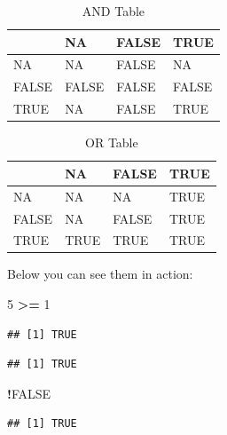 \documentclass[]{book}
\newenvironment{Shaded}{\begin{snugshade}}{\end{snugshade}}
\newcommand{\DecValTok}[1]{\textcolor[rgb]{0.00,0.00,0.81}{#1}}
\newcommand{\StringTok}[1]{\textcolor[rgb]{0.31,0.60,0.02}{#1}}
\newcommand{\OtherTok}[1]{\textcolor[rgb]{0.56,0.35,0.01}{#1}}
\newcommand{\OperatorTok}[1]{\textcolor[rgb]{0.81,0.36,0.00}{\textbf{#1}}}
\theoremstyle{definition}
\theoremstyle{definition}
\theoremstyle{definition}
\theoremstyle{remark}
\begin{document}
\begin{longtable}[t]{llll}
\caption{\label{tab:tab-logics}AND Table}\\
\toprule
  & NA & FALSE & TRUE\\
\midrule
NA & NA & FALSE & NA\\
FALSE & FALSE & FALSE & FALSE\\
TRUE & NA & FALSE & TRUE\\
\bottomrule
\end{longtable}

\begin{longtable}[t]{llll}
\caption{\label{tab:tab-logics}OR Table}\\
\toprule
  & NA & FALSE & TRUE\\
\midrule
NA & NA & NA & TRUE\\
FALSE & NA & FALSE & TRUE\\
TRUE & TRUE & TRUE & TRUE\\
\bottomrule
\end{longtable}

Below you can see them in action:

\begin{Shaded}
\begin{Highlighting}[]
\DecValTok{5} \OperatorTok{>=}\StringTok{ }\DecValTok{1}
\end{Highlighting}
\end{Shaded}

\begin{verbatim}
## [1] TRUE
\end{verbatim}

\begin{Shaded}
\end{Shaded}

\begin{verbatim}
## [1] TRUE
\end{verbatim}

\begin{Shaded}
\begin{Highlighting}[]
\OperatorTok{!}\OtherTok{FALSE}
\end{Highlighting}
\end{Shaded}

\begin{verbatim}
## [1] TRUE
\end{verbatim}
\end{document}
